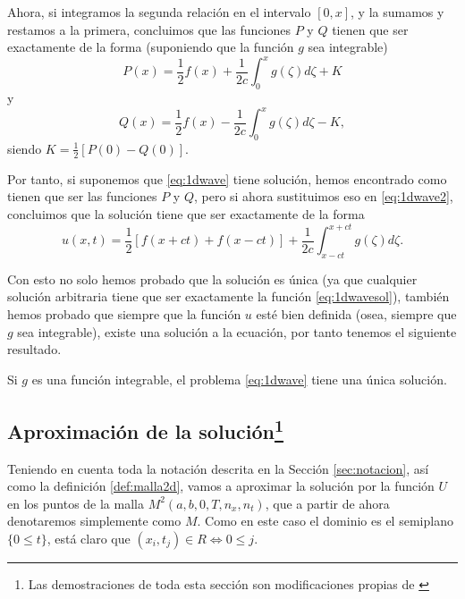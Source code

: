 Ahora, si integramos la segunda relación en el intervalo $[0,x]$, y la sumamos y restamos a la primera, concluimos que las funciones $P$ y $Q$ tienen que ser exactamente de la forma (suponiendo que la función $g$ sea integrable)
\begin{equation}
	P(x) = \frac{1}{2}f(x) + \frac{1}{2c}\int_{0}^{x}g(\zeta)d\zeta + K
\end{equation}
y
\begin{equation}
	Q(x) = \frac{1}{2}f(x) - \frac{1}{2c}\int_{0}^{x}g(\zeta)d\zeta - K,
\end{equation}
siendo $K=\frac{1}{2}[P(0)-Q(0)]$.

Por tanto, si suponemos que \eqref{eq:1dwave} tiene solución, hemos encontrado como tienen que ser las funciones $P$ y $Q$, pero si ahora sustituimos eso en \eqref{eq:1dwave2}, concluimos que la solución tiene que ser exactamente de la forma
\begin{equation}
	\label{eq:1dwavesol}
	u(x,t) = \frac{1}{2}[f(x+ct)+f(x-ct)] + \frac{1}{2c}\int_{x-ct}^{x+ct}g(\zeta)d\zeta.
\end{equation}

Con esto no solo hemos probado que la solución es única (ya que cualquier solución arbitraria tiene que ser exactamente la función \eqref{eq:1dwavesol}), también hemos probado que siempre que la función $u$ esté bien definida (osea, siempre que $g$ sea integrable), existe una solución a la ecuación, por tanto tenemos el siguiente resultado.

\begin{teorema}
	Si $g$ es una función integrable, el problema \eqref{eq:1dwave} tiene una única solución.
\end{teorema}



\subsection[Aproximación de la solución]{Aproximación de la solución\footnote{Las demostraciones de toda esta sección son modificaciones propias de \cite{anummeth}}}

Teniendo en cuenta toda la notación descrita en la Sección \ref{sec:notacion}, así como la definición \ref{def:malla2d}, vamos a aproximar la solución por la función $U$ en los puntos de la malla $M^2(a,b,0,T,n_x,n_t)$, que a partir de ahora denotaremos simplemente como $M$. Como en este caso el dominio es el semiplano $\{0\leq t\}$, está claro que $(x_i,t_j)\in R\iff 0\leq j$.

